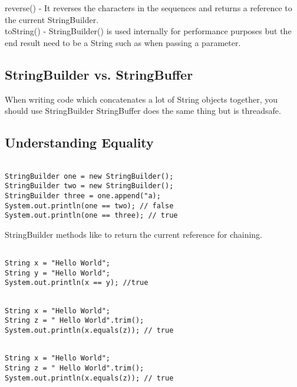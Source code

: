 \documentclass[a4paper]{report}   %
\begin{document}
reverse() - It reverses the characters in the sequences and returns a reference to the current StringBuilder.\\

toString() - StringBuilder() is used internally for performance purposes but the end result need to be a String such as when passing a parameter.

\subsection{StringBuilder vs. StringBuffer}

When writing code which concatenates a lot of String objects together, you should use StringBuilder StringBuffer does the same thing but is threadsafe.

\subsection{Understanding Equality}

\begin{lstlisting}

StringBuilder one = new StringBuilder();
StringBuilder two = new StringBuilder();
StringBuilder three = one.append("a);
System.out.println(one == two); // false
System.out.println(one == three); // true

\end{lstlisting}

StringBuilder methods like to return the current reference for chaining.

\begin{lstlisting}

String x = "Hello World";
String y = "Hello World";
System.out.println(x == y); //true

\end{lstlisting}

\begin{lstlisting}

String x = "Hello World";
String z = " Hello World".trim();
System.out.println(x.equals(z)); // true

\end{lstlisting}

\begin{lstlisting}

String x = "Hello World";
String z = " Hello World".trim();
System.out.println(x.equals(z)); // true

\end{lstlisting}
\end{document}
